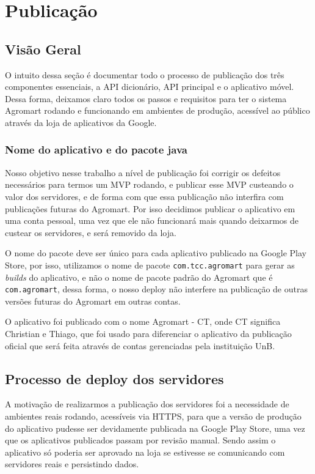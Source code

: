 \chapter[Publicação]{Publicação}
\section{Visão Geral}
O intuito dessa seção é documentar todo o processo de publicação dos três componentes essenciais, a API dicionário, API principal e o aplicativo móvel. Dessa forma, deixamos claro todos os passos e requisitos para ter o sistema Agromart rodando e funcionando em ambientes de produção, acessível ao público através da loja de aplicativos da Google.

\subsection{Nome do aplicativo e do pacote java}
Nosso objetivo nesse trabalho a nível de publicação foi corrigir os defeitos necessários para termos um MVP rodando, e publicar esse MVP custeando o valor dos servidores, e de forma com que essa publicação não interfira com publicações futuras do Agromart. Por isso decidimos publicar o aplicativo em uma conta pessoal, uma vez que ele não funcionará mais quando deixarmos de custear os servidores, e será removido da loja.

O nome do pacote deve ser único para cada aplicativo publicado na Google Play Store, por isso, utilizamos o nome de pacote  \texttt{com.tcc.agromart} para gerar as \textit{builds} do aplicativo, e não o nome de pacote padrão do Agromart que é \texttt{com.agromart}, dessa forma, o nosso deploy não interfere na publicação de outras versões futuras do Agromart em outras contas.

O aplicativo foi publicado com o nome Agromart - CT, onde CT significa Christian e Thiago, que foi usado para diferenciar o aplicativo da publicação oficial que será feita através de contas gerenciadas pela instituição UnB.

\section{Processo de deploy dos servidores}
A motivação de realizarmos a publicação dos servidores foi a necessidade de ambientes reais rodando, acessíveis via HTTPS, para que a versão de produção do aplicativo pudesse ser devidamente publicada na Google Play Store, uma vez que os aplicativos publicados passam por revisão manual. Sendo assim o aplicativo só poderia ser aprovado na loja se estivesse se comunicando com servidores reais e persistindo dados.

